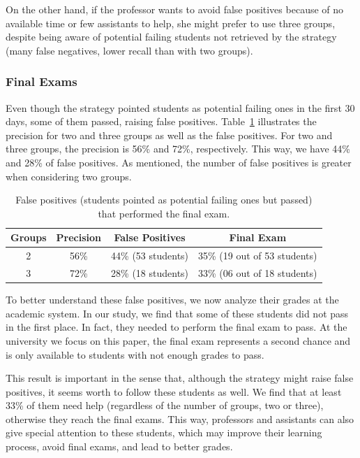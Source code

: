 On the other hand, if the professor wants to avoid false positives because of no available time or few assistants to help, she might prefer to use three groups, despite being aware of potential failing students not retrieved by the strategy (many false negatives, lower recall than with two groups). 


\subsubsection{Final Exams}

Even though the strategy pointed students as potential failing ones in the first 30 days, some of them passed, raising false positives. Table~\ref{tab:final-exams} illustrates the precision for two and three groups as well as the false positives. For two and three groups, the precision is 56\% and 72\%, respectively. This way, we have 44\% and 28\% of false positives. As mentioned, the number of false positives is greater when considering two groups.

\begin{table}[h]
\centering
\begin{tabular}{|c|c|c|c|}
\hline
\textbf{Groups} & \textbf{Precision} & \textbf{False Positives} & \textbf{Final Exam}\\ \hline
2 & 56\% & 44\% (53 students) & 35\% (19 out of 53 students)\\ \hline
3 & 72\% & 28\% (18 students) & 33\% (06 out of 18 students)\\ \hline
\end{tabular}
\caption{False positives (students pointed as potential failing ones but passed) that performed the final exam.}
\label{tab:final-exams}
\end{table}

To better understand these false positives, we now analyze their grades at the academic system. In our study, we find that some of these students did not pass in the first place. In fact, they needed to perform the final exam to pass. At the university we focus on this paper, the final exam represents a second chance and is only available to students with not enough grades to pass.

This result is important in the sense that, although the strategy might raise false positives, it seems worth to follow these students as well. We find that at least 33\% of them need help (regardless of the number of groups, two or three), otherwise they reach the final exams. This way, professors and assistants can also give special attention to these students, which may improve their learning process, avoid final exams, and lead to better grades.

